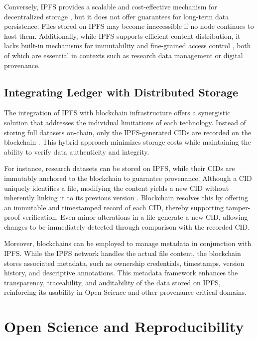 \documentclass[final]{rc-book-2.14}
\begin{document}
Conversely, IPFS provides a scalable and cost-effective mechanism for decentralized storage \cite{benet2014ipfs}, but it does not offer guarantees for long-term data persistence. Files stored on IPFS may become inaccessible if no node continues to host them. Additionally, while IPFS supports efficient content distribution, it lacks built-in mechanisms for immutability and fine-grained access control \cite{steichen2018}, both of which are essential in contexts such as research data management or digital provenance.

\subsection{Integrating Ledger with Distributed Storage}

The integration of IPFS with blockchain infrastructure offers a synergistic solution that addresses the individual limitations of each technology. Instead of storing full datasets on-chain, only the IPFS-generated CIDs are recorded on the blockchain \cite{steichen2018}. This hybrid approach minimizes storage costs while maintaining the ability to verify data authenticity and integrity.

For instance, research datasets can be stored on IPFS, while their CIDs are immutably anchored to the blockchain to guarantee provenance. Although a CID uniquely identifies a file, modifying the content yields a new CID without inherently linking it to its previous version \cite{benet2014ipfs}. Blockchain resolves this by offering an immutable and timestamped record of each CID, thereby supporting tamper-proof verification. Even minor alterations in a file generate a new CID, allowing changes to be immediately detected through comparison with the recorded CID.

Moreover, blockchains can be employed to manage metadata in conjunction with IPFS. While the IPFS network handles the actual file content, the blockchain stores associated metadata, such as ownership credentials, timestamps, version history, and descriptive annotations. This metadata framework enhances the transparency, traceability, and auditability of the data stored on IPFS, reinforcing its usability in Open Science and other provenance-critical domains.


\section{Open Science and Reproducibility}
\label{chp:background:sec:os_rep}
\end{document}
